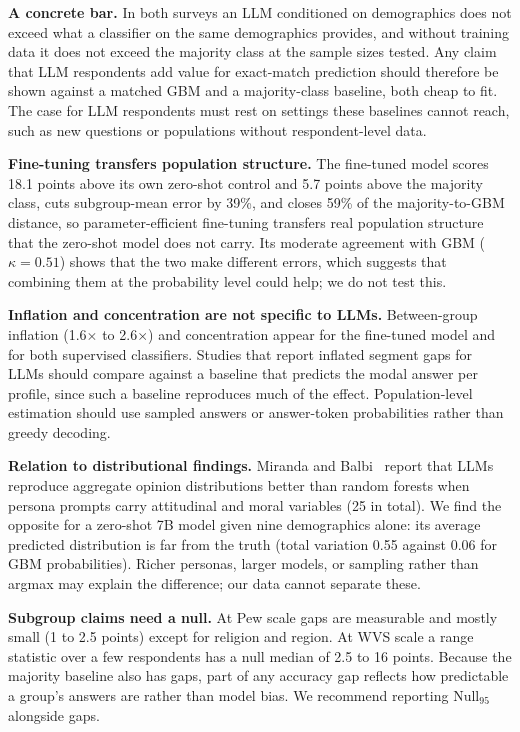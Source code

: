 \documentclass[conference]{IEEEtran}
\begin{document}
\textbf{A concrete bar.} In both surveys an LLM conditioned on demographics does not exceed what a classifier on the same demographics provides, and without training data it does not exceed the majority class at the sample sizes tested. Any claim that LLM respondents add value for exact-match prediction should therefore be shown against a matched GBM and a majority-class baseline, both cheap to fit. The case for LLM respondents must rest on settings these baselines cannot reach, such as new questions or populations without respondent-level data.

\textbf{Fine-tuning transfers population structure.} The fine-tuned model scores 18.1 points above its own zero-shot control and 5.7 points above the majority class, cuts subgroup-mean error by 39\%, and closes 59\% of the majority-to-GBM distance, so parameter-efficient fine-tuning transfers real population structure that the zero-shot model does not carry. Its moderate agreement with GBM ($\kappa=0.51$) shows that the two make different errors, which suggests that combining them at the probability level could help; we do not test this.

\textbf{Inflation and concentration are not specific to LLMs.} Between-group inflation (1.6$\times$ to 2.6$\times$) and concentration appear for the fine-tuned model and for both supervised classifiers. Studies that report inflated segment gaps for LLMs should compare against a baseline that predicts the modal answer per profile, since such a baseline reproduces much of the effect. Population-level estimation should use sampled answers or answer-token probabilities rather than greedy decoding.

\textbf{Relation to distributional findings.} Miranda and Balbi~\cite{miranda2025} report that LLMs reproduce aggregate opinion distributions better than random forests when persona prompts carry attitudinal and moral variables (25 in total). We find the opposite for a zero-shot 7B model given nine demographics alone: its average predicted distribution is far from the truth (total variation 0.55 against 0.06 for GBM probabilities). Richer personas, larger models, or sampling rather than argmax may explain the difference; our data cannot separate these.

\textbf{Subgroup claims need a null.} At Pew scale gaps are measurable and mostly small (1 to 2.5 points) except for religion and region. At WVS scale a range statistic over a few respondents has a null median of 2.5 to 16 points. Because the majority baseline also has gaps, part of any accuracy gap reflects how predictable a group's answers are rather than model bias. We recommend reporting $\mathrm{Null}_{95}$ alongside gaps.
\end{document}

